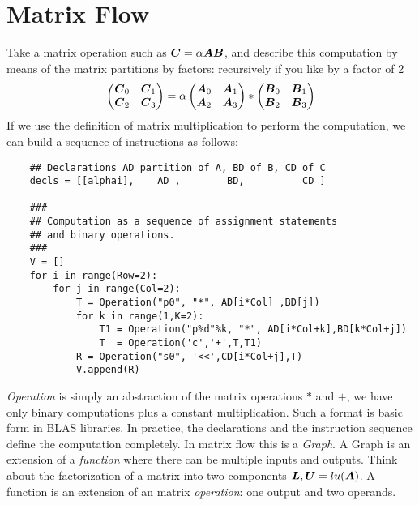 \documentclass[acmsmall]{acmart}
\begin{document}
\section{Matrix Flow}
\label{sec:matrixflow}

Take a matrix operation such as ${\boldsymbol C} = \alpha {\boldsymbol A}{\boldsymbol B}$, and
describe this computation by means of the matrix partitions by
factors: recursively if you like by a factor of 2
\begin{equation}
  \label{basic_2}
  \begin{pmatrix}
    {\boldsymbol C}_0 & {\boldsymbol C}_1 \\
    {\boldsymbol C}_2 & {\boldsymbol C}_3 \\
  \end{pmatrix} = \alpha
  \begin{pmatrix}
    {\boldsymbol A}_0 & {\boldsymbol A}_1 \\
    {\boldsymbol A}_2 & {\boldsymbol A}_3 \\
  \end{pmatrix} *
  \begin{pmatrix}
    {\boldsymbol B}_0 & {\boldsymbol B}_1 \\
    {\boldsymbol B}_2 & {\boldsymbol B}_3 \\
  \end{pmatrix} 
\end{equation}
If we use the definition of matrix multiplication to perform the
computation, we can build a sequence of instructions as follows:
\begin{verbatim}
    ## Declarations AD partition of A, BD of B, CD of C 
    decls = [[alphai],    AD ,        BD,          CD ]     

    ###
    ## Computation as a sequence of assignment statements
    ## and binary operations.  
    ###
    V = []
    for i in range(Row=2):
        for j in range(Col=2):
            T = Operation("p0", "*", AD[i*Col] ,BD[j])
            for k in range(1,K=2):
                T1 = Operation("p%d"%k, "*", AD[i*Col+k],BD[k*Col+j])
                T  = Operation('c','+',T,T1)
            R = Operation("s0", '<<',CD[i*Col+j],T)
            V.append(R)
\end{verbatim}
{\em Operation} is simply an abstraction of the matrix operations $*$
and $+$, we have only binary computations plus a constant
multiplication. Such a format is basic form in BLAS libraries. In
practice, the declarations and the instruction sequence define the
computation completely. In matrix flow this is a {\em Graph}. A Graph
is an extension of a {\em function} where there can be multiple inputs
and outputs.  Think about the factorization of a matrix into two
components ${\boldsymbol L},{\boldsymbol U} = lu({\boldsymbol A})$. A function is an extension of
an matrix {\em operation}: one output and two operands.
\end{document}
